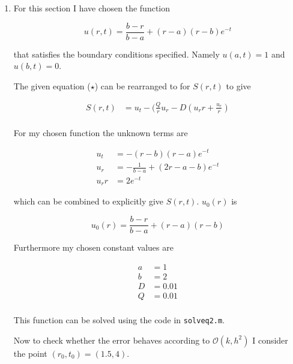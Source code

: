 \documentclass{article}
\begin{document}
\begin{enumerate}
	\newpage
	\item For this section I have chosen the function 
	
	\begin{equation}
		u(r,t) = \frac{b - r}{b - a} + (r-a) (r-b) e^{-t}
	\end{equation}

	that satisfies the boundary conditions specified. Namely $u(a,t) = 1$ and $u(b,t) = 0$. 
	
	The given equation ($\star$) can be rearranged to for $S(r,t)$ to give
	
	\begin{equation}
		\begin{split}
			S(r,t) &= u_t - (\frac{Q}{r} u_r - D (u_rr + \frac{u_r}{r}) \\
		\end{split}
	\end{equation}
	
	For my chosen function the unknown terms are
	
	\begin{equation}
	\begin{split}
		u_t &= - (r-b) (r-a) e^{-t} \\
        u_r &= - \frac{1}{b-a} + ( 2r - a - b ) e^{-t} \\
        u_rr &= 2e^{-t}
    \end{split}
	\end{equation}
	
	which can be combined to explicitly give $S(r,t)$. $u_0(r)$ is
	
	\begin{equation}
		u_0(r) = \frac{b - r}{b - a} + (r-a)(r-b)
	\end{equation}
	
	Furthermore my chosen constant values are
	
	\begin{equation}
		\begin{split}
			a &= 1\\
			b &= 2\\
			D &= 0.01\\
			Q &= 0.01\\
		\end{split}
	\end{equation}
	
	This function can be solved using the code in \texttt{solveq2.m}. 
	
	Now to check whether the error behaves according to $\mathcal{O}(k,h^2)$ I consider the point $(r_0,t_0) = (1.5, 4)$.
	

\end{enumerate}
\end{document}
